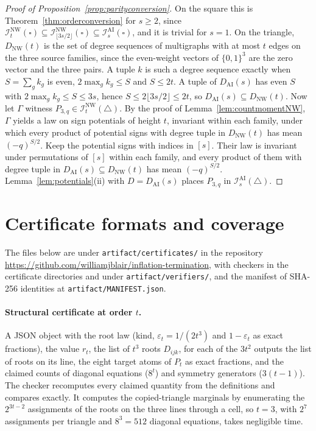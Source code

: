 \documentclass[11pt]{article}
\theoremstyle{plain}
\theoremstyle{definition}
\newcommand{\INW}{\mathcal I^{\mathrm{NW}}}
\newcommand{\IAI}{\mathcal I^{\mathrm{AI}}}
\newcommand{\eps}{\varepsilon}
\newcommand{\repourl}{https://github.com/williamjblair/inflation-termination}
\newcommand{\repo}{\url{\repourl}}
\begin{document}
\begin{proof}[Proof of Proposition~\ref{prop:parityconversion}]
On the square this is Theorem~\ref{thm:orderconversion} for $s\ge2$, since $\INW_t(\square)\subseteq\INW_{\lfloor3s/2\rfloor}(\square)\subseteq\IAI_s(\square)$, and it is trivial for $s=1$. On the triangle, $D_{\mathrm{NW}}(t)$ is the set of degree sequences of multigraphs with at most $t$ edges on the three source families, since the even-weight vectors of $\{0,1\}^3$ are the zero vector and the three pairs. A tuple $k$ is such a degree sequence exactly when $S=\sum_gk_g$ is even, $2\max_gk_g\le S$ and $S\le2t$. A tuple of $D_{\mathrm{AI}}(s)$ has even $S$ with $2\max_gk_g\le S\le3s$, hence $S\le2\lfloor3s/2\rfloor\le2t$, so $D_{\mathrm{AI}}(s)\subseteq D_{\mathrm{NW}}(t)$. Now let $\Gamma$ witness $P_{3,q}\in\INW_t(\triangle)$. By the proof of Lemma~\ref{lem:countmomentNW}, $\Gamma$ yields a law on sign potentials of height $t$, invariant within each family, under which every product of potential signs with degree tuple in $D_{\mathrm{NW}}(t)$ has mean $(-q)^{S/2}$. Keep the potential signs with indices in $[s]$. Their law is invariant under permutations of $[s]$ within each family, and every product of them with degree tuple in $D_{\mathrm{AI}}(s)\subseteq D_{\mathrm{NW}}(t)$ has mean $(-q)^{S/2}$. Lemma~\ref{lem:potentials}(ii) with $D=D_{\mathrm{AI}}(s)$ places $P_{3,q}$ in $\IAI_s(\triangle)$.
\end{proof}

\section{Certificate formats and coverage}\label{app:certificates}

The files below are under \texttt{artifact/certificates/} in the repository \repo, with checkers in the certificate directories and under \texttt{artifact/verifiers/}, and the manifest of SHA-256 identities at \texttt{artifact/MANIFEST.json}.

\paragraph{Structural certificate at order $t$.}
A JSON object with the root law (kind, $\eps_t=1/(2t^3)$ and $1-\eps_t$ as exact fractions), the value $r_t$, the list of $t^3$ roots $D_{ijk}$, for each of the $3t^2$ outputs the list of roots on its line, the eight target atoms of $P_t$ as exact fractions, and the claimed counts of diagonal equations ($8^t$) and symmetry generators ($3(t-1)$). The checker recomputes every claimed quantity from the definitions and compares exactly. It computes the copied-triangle marginals by enumerating the $2^{3t-2}$ assignments of the roots on the three lines through a cell, so $t=3$, with $2^7$ assignments per triangle and $8^3=512$ diagonal equations, takes negligible time.
\end{document}
